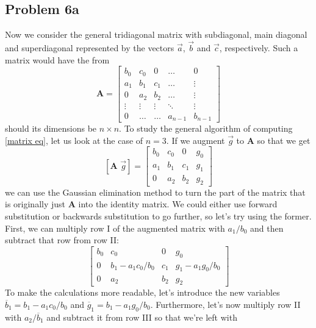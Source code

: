 \documentclass[english,notitlepage]{revtex4-1}  %
\begin{document}
\subsection*{Problem 6a}
Now we consider the general tridiagonal matrix with subdiagonal, main diagonal and superdiagonal represented by the vectors $\vec{a}$, $\vec{b}$ and $\vec{c}$, respectively. Such a matrix would have the from
\begin{equation}
    \textbf{A} = \begin{bmatrix}
        b_0 & c_0 & 0 & \ldots & 0 \\
        a_1 & b_1 & c_1 & \ldots & \vdots\\
        0 & a_2 & b_2 & \ldots & \vdots\\
        \vdots&\vdots&\vdots&\ddots&\vdots\\
        0 & \ldots & \ldots & a_{n-1} & b_{n-1} 
    \end{bmatrix}
\end{equation}
should its dimensions be $n \times n$. To study the general algorithm of computing \eqref{matrix eq}, let us look at the case of $n = 3$. If we augment $\vec{g}$ to $\textbf{A}$ so that we get
\begin{equation}
    \left[\textbf{A }\vec{g}\right] = \begin{bmatrix}
        b_0 & c_0 & 0 & g_0 \\
        a_1 & b_1 & c_1 & g_1 \\
        0 & a_2 & b_2 & g_2 
    \end{bmatrix}
\end{equation}
we can use the Gaussian elimination method to turn the part of the matrix that is originally just $\textbf{A}$ into the identity matrix. We could either use forward substitution or backwards substitution to go further, so let's try using the former. First, we can multiply row I of the augmented matrix with $a_1/b_0$ and then subtract that row from row II:
\begin{equation}
    \begin{bmatrix}
        b_0 & c_0 & 0 & g_0 \\
        0 & b_1 - a_1c_0/b_0 & c_1 & g_1 - a_1g_0/b_0 \\
        0 & a_2 & b_2 & g_2 
    \end{bmatrix}
\end{equation}
To make the calculations more readable, let's introduce the new variables $\overline{b}_1 = b_1 - a_1c_0/b_0$ and $\overline{g}_1 = b_1 - a_1g_0/b_0$. Furthermore, let's now multiply row II with $a_2/\overline{b}_1$ and subtract it from row III so that we're left with
\end{document}
